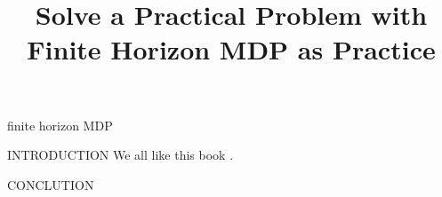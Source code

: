 \documentclass[10pt, conference, letterpaper]{IEEEtran}
\begin{document}
    \title{
        Solve a Practical Problem with Finite Horizon MDP as Practice
    }
    \author{
    }
    \maketitle

    \begin{abstract}
        \label{sec:abstract}
    \end{abstract}

    \begin{IEEEkeywords}
        finite horizon MDP
    \end{IEEEkeywords}

    \begin{section}{INTRODUCTION}
        \label{sec:introduction}
        We all like this book \cite{sutton1998introduction}.
    \end{section}

    
    
    
    

    \begin{section}{CONCLUTION}
        \label{sec:conclusion}
    \end{section}

    
    
\end{document}
